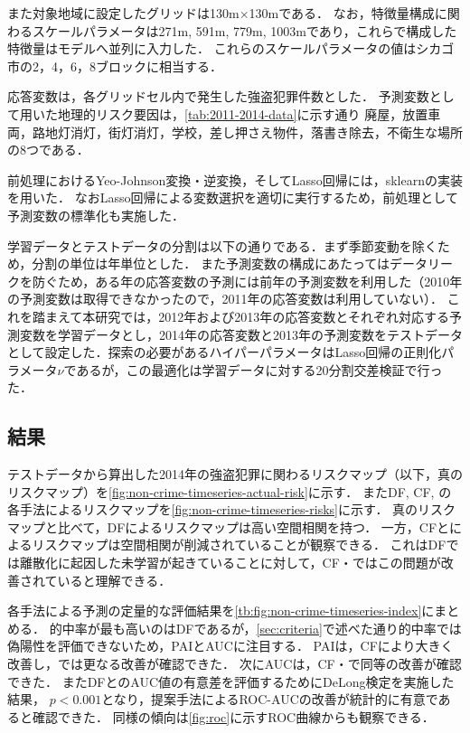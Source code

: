 また対象地域に設定したグリッドは130m$\times$130mである．
なお，特徴量構成に関わるスケールパラメータは271m, 591m, 779m, 1003mであり，これらで構成した特徴量はモデルへ並列に入力した．
これらのスケールパラメータの値はシカゴ市の2，4，6，8ブロックに相当する．

応答変数は，各グリッドセル内で発生した強盗犯罪件数とした．
予測変数として用いた地理的リスク要因は，\cref{tab:2011-2014-data}に示す通り
廃屋，放置車両，路地灯消灯，街灯消灯，学校，差し押さえ物件，落書き除去，不衛生な場所
の8つである．

前処理におけるYeo-Johnson変換・逆変換，そしてLasso回帰には，sklearn\cite{scikit-learn}の実装を用いた．
なおLasso回帰による変数選択を適切に実行するため，前処理として予測変数の標準化も実施した．

学習データとテストデータの分割は以下の通りである．まず季節変動を除くため，分割の単位は年単位とした．
また予測変数の構成にあたってはデータリークを防ぐため，ある年の応答変数の予測には前年の予測変数を利用した（2010年の予測変数は取得できなかったので，2011年の応答変数は利用していない）．
これを踏まえて本研究では，2012年および2013年の応答変数とそれぞれ対応する予測変数を学習データとし，2014年の応答変数と2013年の予測変数をテストデータとして設定した．探索の必要があるハイパーパラメータはLasso回帰の正則化パラメータ$\nu$であるが，この最適化は学習データに対する20分割交差検証で行った．

\subsection{結果}
テストデータから算出した2014年の強盗犯罪に関わるリスクマップ（以下，真のリスクマップ）を\cref{fig:non-crime-timeseries-actual-risk}に示す．
またDF, CF, \cfsq の各手法によるリスクマップを\cref{fig:non-crime-timeseries-risks}に示す．
真のリスクマップと比べて，DFによるリスクマップは高い空間相関を持つ．
一方，CFと\cfsq によるリスクマップは空間相関が削減されていることが観察できる．
これはDFでは離散化に起因した未学習が起きていることに対して，CF・\cfsq ではこの問題が改善されていると理解できる．

各手法による予測の定量的な評価結果を\cref{tb:fig:non-crime-timeseries-index}にまとめる．
的中率が最も高いのはDFであるが，\cref{sec:criteria}で述べた通り的中率では偽陽性を評価できないため，PAIとAUCに注目する．
PAIは，CFにより大きく改善し，\cfsq では更なる改善が確認できた．
次にAUCは，CF・\cfsq で同等の改善が確認できた．
またDFと\cfsq のAUC値の有意差を評価するためにDeLong検定\cite{DeLong}を実施した結果，
$p<0.001$となり，提案手法によるROC-AUCの改善が統計的に有意であると確認できた．
同様の傾向は\cref{fig:roc}に示すROC曲線からも観察できる．


